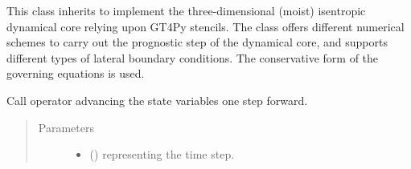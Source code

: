 \documentclass[letterpaper,10pt,english]{sphinxmanual}
\begin{document}
\begin{fulllineitems}
\begin{fulllineitems}
\begin{quote}
\begin{description}
\end{description}\end{quote}

\end{fulllineitems}


\end{fulllineitems}


\begin{fulllineitems}
\label{\detokenize{api:dycore.dycore_isentropic.DynamicalCoreIsentropic}}
This class inherits  to implement the three-dimensional
(moist) isentropic dynamical core relying upon GT4Py stencils. The class offers different numerical
schemes to carry out the prognostic step of the dynamical core, and supports different types of
lateral boundary conditions. The conservative form of the governing equations is used.

\begin{fulllineitems}
\label{\detokenize{api:dycore.dycore_isentropic.DynamicalCoreIsentropic.__call__}}
Call operator advancing the state variables one step forward.
\begin{quote}\begin{description}
\item[{Parameters}] \leavevmode\begin{itemize}
\item {} 
 () \textendash{}  representing the time step.


\end{itemize}
\end{description}
\end{quote}
\end{fulllineitems}
\end{fulllineitems}
\end{document}
